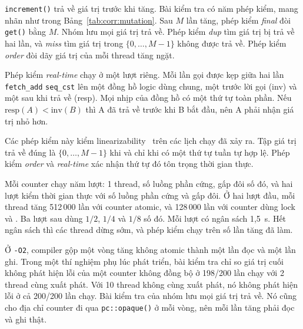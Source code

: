 \label{sec:corr:counter}

\texttt{increment()} trả về giá trị trước khi tăng. Bài kiểm tra có năm phép kiểm, mang nhãn như trong
Bảng~\ref{tab:corr:mutation}. Sau $M$ lần tăng, phép kiểm \emph{final} đòi \texttt{get()} bằng $M$.
Nhóm lưu mọi giá trị trả về. Phép kiểm \emph{dup} tìm giá trị bị trả về hai lần, và \emph{miss} tìm giá
trị trong $\{0,\dots,M-1\}$ không được trả về. Phép kiểm \emph{order} đòi dãy giá trị của mỗi thread
tăng ngặt.

Phép kiểm \emph{real-time} chạy ở một lượt riêng. Mỗi lần gọi được kẹp giữa hai lần \texttt{fetch\_add}
\texttt{seq\_cst} lên một đồng hồ logic dùng chung, một trước lời gọi (inv) và một sau khi trả về (resp).
Mọi nhịp của đồng hồ có một thứ tự toàn phần. Nếu $\mathrm{resp}(A) < \mathrm{inv}(B)$ thì A đã trả về
trước khi B bắt đầu, nên A phải nhận giá trị nhỏ hơn.

Các phép kiểm này kiểm linearizability~\cite{herlihy1990linearizability} trên các lịch chạy đã xảy ra.
Tập giá trị trả về đúng là $\{0,\dots,M-1\}$ khi và chỉ khi có một thứ tự tuần tự hợp lệ. Phép kiểm
\emph{order} và \emph{real-time} xác nhận thứ tự đó tôn trọng thời gian thực.

Mỗi counter chạy năm lượt: 1 thread, số luồng phần cứng, gấp đôi số đó, và hai lượt kiểm thời gian thực
với số luồng phần cứng và gấp đôi. Ở hai lượt đầu, mỗi thread tăng 512\,000 lần với counter atomic, và
128\,000 lần với counter dùng lock và . Ba lượt sau dùng $1/2$, $1/4$ và $1/8$ số đó. Mỗi
lượt có ngân sách 1,5~s. Hết ngân sách thì các thread dừng sớm, và phép kiểm chạy trên số lần tăng đã làm.

Ở \texttt{-O2}, compiler gộp một vòng tăng không atomic thành một lần đọc và một lần ghi. Trong một thí
nghiệm phụ lúc phát triển, bài kiểm tra chỉ so giá trị cuối không phát hiện lỗi của một counter không
đồng bộ ở 198/200 lần chạy với 2 thread cùng xuất phát. Với 10 thread không cùng xuất phát, nó không
phát hiện lỗi ở cả 200/200 lần chạy.
Bài kiểm tra của nhóm lưu mọi giá trị trả về. Nó cũng cho địa chỉ counter đi qua \texttt{pc::opaque()} ở mỗi vòng, nên mỗi lần
tăng phải đọc và ghi thật.

